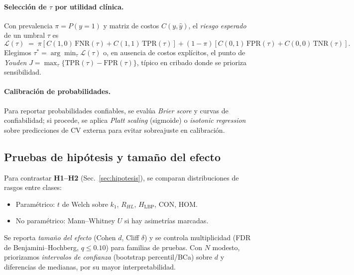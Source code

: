 \paragraph{Selección de $\tau$ por utilidad clínica.} Con prevalencia $\pi=P(y{=}1)$ y matriz de costos $C(y,\hat{y})$, el \emph{riesgo esperado} de un umbral $\tau$ es
\begin{equation}
\mathcal{L}(\tau) \;=\; \pi\left[ C(1,0)\,\mathrm{FNR}(\tau) + C(1,1)\,\mathrm{TPR}(\tau)\right] 
+ (1-\pi)\left[ C(0,1)\,\mathrm{FPR}(\tau) + C(0,0)\,\mathrm{TNR}(\tau)\right].
\end{equation}
Elegimos $\tau^\ast=\arg\min_\tau \mathcal{L}(\tau)$ o, en ausencia de costos explícitos, el punto de \emph{Youden} $J=\max_\tau \{\mathrm{TPR}(\tau)-\mathrm{FPR}(\tau)\}$, típico en cribado donde se prioriza sensibilidad.

\paragraph{Calibración de probabilidades.} Para reportar probabilidades confiables, se evalúa \emph{Brier score} y curvas de confiabilidad; si procede, se aplica \emph{Platt scaling} (sigmoide) o \emph{isotonic regression} sobre predicciones de CV externa para evitar sobreajuste en calibración.

\subsection{Pruebas de hipótesis y tamaño del efecto}
\label{subsec:hypothesis}

Para contrastar \textbf{H1--H2} (Sec.~\ref{sec:hipotesis}), se comparan distribuciones de rasgos entre clases:
\begin{itemize}
\item Paramétrico: $t$ de Welch sobre $k_1$, $R_{HL}$, $H_\text{LBP}$, $\mathrm{CON}$, $\mathrm{HOM}$.
\item No paramétrico: Mann–Whitney $U$ si hay asimetrías marcadas.
\end{itemize}
Se reporta \emph{tamaño del efecto} (Cohen $d$, Cliff $\delta$) y se controla multiplicidad (FDR de Benjamini–Hochberg, $q\le 0.10$) para familias de pruebas. Con $N$ modesto, priorizamos \emph{intervalos de confianza} (bootstrap percentil/BCa) sobre $d$ y diferencias de medianas, por su mayor interpretabilidad.

